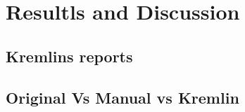 \chapter{Resultls and Discussion}\label{chap:chap5}

\section*{}

\section{Kremlins reports}

\section{Original Vs Manual vs Kremlin}